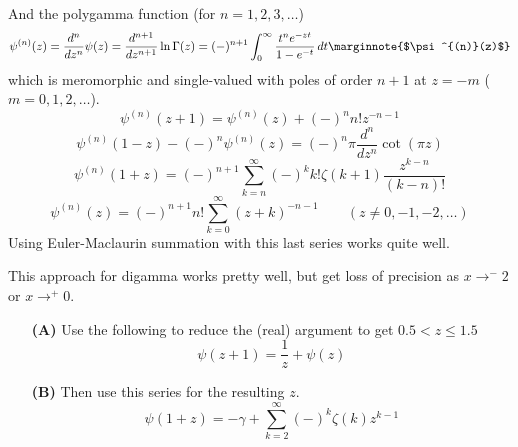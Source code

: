 \documentclass[10pt,dvipdfmx,letterpaper,twoside]{article}
\newenvironment{implementation}{\noindent\begin{framed}}{\end{framed}}
\let\DEF=\marginnote
\let\Gam=\Gamma
\begin{document}
And the polygamma function (for $n=1,2,3,\dots$)
\[ \psi^{(n)}(z) = \frac{d^n}{dz^n}\psi(z) = \frac{d^{n+1}}{dz^{n+1}}\ln\Gam(z)
    = (-)^{n+1}\int_0^\infty\frac{t^n e^{-zt}}{1-e^{-t}}\,dt \DEF{$\psi^{(n)}(z)$}\]
which is meromorphic and single-valued with poles of order $n+1$ at $z=-m$ ($m=0,1,2,\dots$).
\[ \psi^{(n)}(z+1) = \psi^{(n)}(z) + (-)^n n! z^{-n-1} \]
\[ \psi^{(n)}(1-z) - (-)^n\psi^{(n)}(z) = (-)^n \pi \frac{d^n}{dz^n}\cot(\pi z) \]
\[ \psi^{(n)}(1+z) = (-)^{n+1}\sum_{k=n}^\infty (-)^k k!\zeta(k+1)\frac{z^{k-n}}{(k-n)!} \]
\[ \psi^{(n)}(z) = (-)^{n+1} n! \sum_{k=0}^\infty (z+k)^{-n-1} \qquad(z\neq0,-1,-2,\dots) \]
Using Euler-Maclaurin summation with this last series works quite well.

\begin{implementation}
This approach for digamma works pretty well, but get loss of precision as $x\to^-2$ or $x\to^+0$.
\begin{itemize}
\item[\bf(A)] Use the following to reduce the (real) argument to get $0.5<z\leq1.5$
    \[ \psi(z+1) = \frac{1}{z} + \psi(z) \]
\item[\bf(B)] Then use this series for the resulting $z$.
    \[ \psi(1+z) = -\gamma + \sum_{k=2}^\infty (-)^k \zeta(k) z^{k-1} \]
\end{itemize}
\end{implementation}
\end{document}
